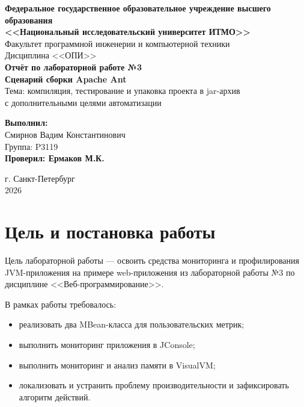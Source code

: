 \documentclass[12pt,a4paper]{article}
\begin{document}
\begin{titlepage}
\begin{center}
\textbf{Федеральное государственное образовательное учреждение высшего образования}\\
\textbf{<<Национальный исследовательский университет ИТМО>>}\\[1.5cm]

Факультет программной инженерии и компьютерной техники\\
Дисциплина <<ОПИ>>\\[2.5cm]

\textbf{\Large Отчёт по лабораторной работе №3}\\[0.3cm]
\textbf{\Large Сценарий сборки Apache Ant}\\[0.8cm]
\normalsize
Тема: компиляция, тестирование и упаковка проекта в jar-архив\\
с дополнительными целями автоматизации
\end{center}

\vfill

\begin{flushright}
\textbf{Выполнил:}\\
Смирнов Вадим Константинович\\
Группа: P3119\\[0.7cm]

\textbf{Проверил: Ермаков М.К.}\\
\underline{\hspace{6cm}}
\end{flushright}

\vfill

\begin{center}
г. Санкт-Петербург\\
2026
\end{center}
\end{titlepage}

\tableofcontents
\newpage

\section{Цель и постановка работы}
Цель лабораторной работы --- освоить средства мониторинга и профилирования JVM-приложения
на примере web-приложения из лабораторной работы №3 по дисциплине <<Веб-программирование>>.

В рамках работы требовалось:
\begin{itemize}
    \item реализовать два MBean-класса для пользовательских метрик;
    \item выполнить мониторинг приложения в JConsole;
    \item выполнить мониторинг и анализ памяти в VisualVM;
    \item локализовать и устранить проблему производительности и зафиксировать алгоритм действий.
\end{itemize}
\end{document}
